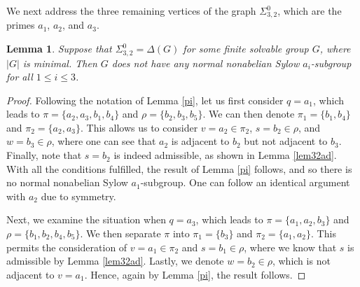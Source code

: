 \documentclass[11pt]{amsart}
\newtheorem{lemma}[theorem]{Lemma}
\theoremstyle{definition}
\theoremstyle{remark}
\numberwithin{equation}{section}
\newcommand{\SZ}[2]{\Sigma_{#1,#2}^0} %
\begin{document}
We next address the three remaining vertices of the graph $\SZ{3}{2}$, which are the primes $a_1$, $a_2$, and $a_3$.

\begin{lemma}\label{lem32pi}
Suppose that $\SZ{3}{2}=\Delta(G)$ for some finite solvable group $G$, where $|G|$ is minimal. Then $G$ does not have any normal nonabelian Sylow $a_i$-subgroup for all $1\leq i\leq3$.
\end{lemma}
\begin{proof}
Following the notation of Lemma \ref{pi}, let us first consider $q=a_1$, which leads to $\pi=\{a_2,a_3,b_1,b_4\}$ and $\rho=\{b_2,b_3,b_5\}$. We can then denote $\pi_1=\{b_1,b_4\}$ and $\pi_2=\{a_2,a_3\}$. This allows us to consider $v=a_2\in\pi_2$, $s=b_2\in\rho$, and $w=b_3\in\rho$, where one can see that $a_2$ is adjacent to $b_2$ but not adjacent to $b_3$. Finally, note that $s=b_2$ is indeed admissible, as shown in Lemma \ref{lem32ad}. With all the conditions fulfilled, the result of Lemma \ref{pi} follows, and so there is no normal nonabelian Sylow $a_1$-subgroup. One can follow an identical argument with $a_2$ due to symmetry.

Next, we examine the situation when $q=a_3$, which leads to $\pi=\{a_1,a_2,b_3\}$ and $\rho=\{b_1,b_2,b_4,b_5\}$. We then separate $\pi$ into $\pi_1=\{b_3\}$ and $\pi_2=\{a_1,a_2\}$. This permits the consideration of $v=a_1\in\pi_2$ and $s=b_1\in\rho$, where we know that $s$ is admissible by Lemma \ref{lem32ad}. Lastly, we denote $w=b_2\in\rho$, which is not adjacent to $v=a_1$. Hence, again by Lemma \ref{pi}, the result follows.
\end{proof}
\end{document}
